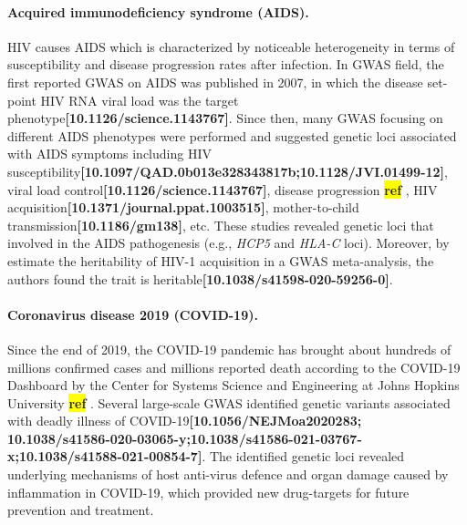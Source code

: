 \documentclass[12pt,usletter, fancy]{elegantbook}
\newcommand{\reqref}[1][ref]{
  \colorbox{yellow}{\textbf{#1}}
}
\begin{document}
\paragraph*{Acquired immunodeficiency syndrome (AIDS).}
HIV causes AIDS which is characterized by noticeable heterogeneity in terms of susceptibility and disease progression rates after infection.
In GWAS field, the first reported GWAS on AIDS was published in 2007, in which the disease set-point HIV RNA viral load was the target phenotype\textbf{[10.1126/science.1143767]}.
Since then, many GWAS focusing on different AIDS phenotypes were performed and suggested genetic loci associated with AIDS symptoms including HIV susceptibility\textbf{[10.1097/QAD.0b013e328343817b;10.1128/JVI.01499-12]}, viral load control\textbf{[10.1126/science.1143767]}, disease progression\reqref, HIV acquisition\textbf{[10.1371/journal.ppat.1003515]}, mother-to-child transmission\textbf{[10.1186/gm138]}, etc.
These studies revealed genetic loci that involved in the AIDS pathogenesis (e.g., \textit{HCP5} and \textit{HLA-C} loci).
Moreover, by estimate the heritability of HIV-1 acquisition in a GWAS meta-analysis, the authors found the trait is heritable\textbf{[10.1038/s41598-020-59256-0]}.

\paragraph*{Coronavirus disease 2019 (COVID-19).}
Since the end of 2019, the COVID-19 pandemic has brought about hundreds of millions confirmed cases and millions reported death according to the COVID-19 Dashboard by the Center for Systems Science and Engineering at Johns Hopkins University\reqref.
Several large-scale GWAS identified genetic variants associated with deadly illness of COVID-19\textbf{[10.1056/NEJMoa2020283; 10.1038/s41586-020-03065-y;10.1038/s41586-021-03767-x;10.1038/s41588-021-00854-7]}.
The identified genetic loci revealed underlying mechanisms of host anti-virus defence and organ damage caused by inflammation in COVID-19, which provided new drug-targets for future prevention and treatment.
\end{document}
